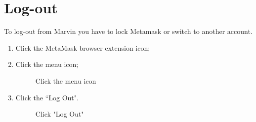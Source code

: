 \documentclass[ManualeUtente]{subfiles}
\begin{document}
\section{Log-out}
To log-out from Marvin you have to lock Metamask or switch to another account.
\begin{enumerate}
	\item Click the MetaMask browser extension icon;
	\item Click the menu icon;
	\begin{figure}[H]
		\centering
		\caption{Click the menu icon}
		\label{fig:Click the menu icon}
	\end{figure}
	\item Click the \textquotedblleft Log Out".
	\begin{figure}[H]
		\centering
		\caption{Click "Log Out"}
		\label{fig:Click "Log Out"}
	\end{figure}
\end{enumerate}
\end{document}
